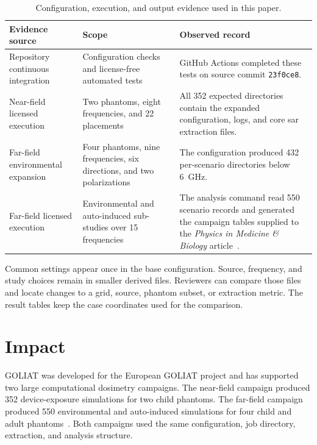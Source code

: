 \documentclass[final,5p,times,twocolumn]{elsarticle}
\begin{document}
\begin{table}[!ht]
\centering
\small
\begin{tabularx}{\textwidth}{@{}>{\raggedright\arraybackslash}p{}>{\raggedright\arraybackslash}p{}>{\raggedright\arraybackslash}X@{}}
\toprule
Evidence source & Scope & Observed record \\
\midrule
Repository continuous integration & Configuration checks and license-free automated tests & GitHub Actions completed these tests on source commit \texttt{23f0ce8}. \\
Near-field licensed execution & Two phantoms, eight frequencies, and 22 placements & All 352 expected directories contain the expanded configuration, logs, and core \gls{sar} extraction files. \\
Far-field environmental expansion & Four phantoms, nine frequencies, six directions, and two polarizations & The configuration produced 432 per-scenario directories below 6~GHz. \\
Far-field licensed execution & Environmental and auto-induced sub-studies over 15 frequencies & The analysis command read 550 scenario records and generated the campaign tables supplied to the \emph{Physics in Medicine \& Biology} article~\cite{GOLIATFarField}. \\
\bottomrule
\end{tabularx}
\caption{Configuration, execution, and output evidence used in this paper.}
\label{tab:evidence}
\end{table}

Common settings appear once in the base configuration. Source, frequency, and study choices remain in smaller derived files. Reviewers can compare those files and locate changes to a grid, source, phantom subset, or extraction metric. The result tables keep the case coordinates used for the comparison.

\FloatBarrier
\section{Impact}

GOLIAT was developed for the European GOLIAT project and has supported two large computational dosimetry campaigns. The near-field campaign produced 352 device-exposure simulations for two child phantoms. The far-field campaign produced 550 environmental and auto-induced simulations for four child and adult phantoms~\cite{GOLIATFarField}. Both campaigns used the same configuration, job directory, extraction, and analysis structure.
\end{document}
